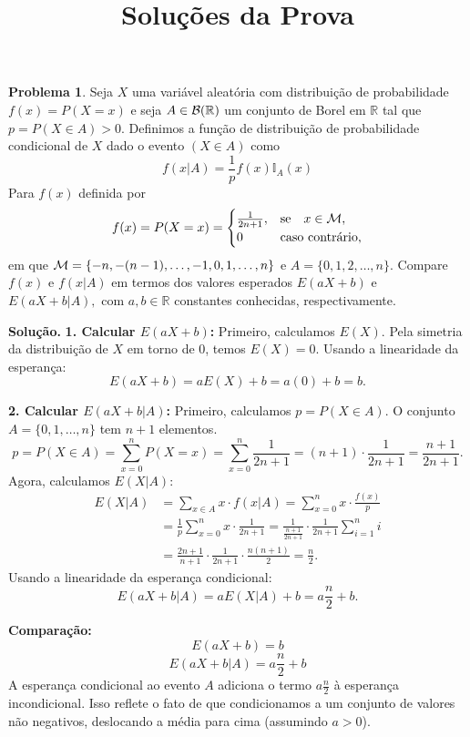 \documentclass{article}
\title{Soluções da Prova}
\author{}
\date{}
\theoremstyle{definition}
\newtheorem{problema}{Problema}
\newenvironment{solucao}{\par\noindent\textbf{Solução.}}{\par}
\begin{document}
	
	\maketitle
	
	\begin{problema}{}
		Seja $X$ uma variável aleatória com distribuição de probabilidade $f(x)=P(X=x)$ e seja $A\in {\cal B}(\mathbb{R})$ um conjunto de Borel em $\mathbb{R}$ tal que $p=P(X\in A)>0.$ Definimos a função de distribuição de probabilidade condicional de $X$ dado o evento $(X\in A)$ como
		$$
		f(x|A) = \frac{1}{p}f(x)\mathbb{I}_A(x)
		$$
		Para $f(x)$  definida por
		$$
		f(x)=P(X=x) = \begin{cases}
			\frac{1}{2n+1}, & \text{se} \quad x \in {\cal M}, \\
			0 & \text{caso contrário},
		\end{cases}
		$$ em que ${\cal M}=\{-n,-(n-1), \ldots, -1, 0, 1, \ldots, n \} $ e $A=\{0,1,2, \ldots, n\}.$ 
		Compare $f(x)$ e $f(x|A)$ em termos dos valores esperados $E(aX+b)$ e $E(aX+b|A),$ com $a,b \in \mathbb{R}$ constantes conhecidas, respectivamente. 
	\end{problema}
	
	\begin{solucao}
		\textbf{1. Calcular $E(aX+b)$:}
		Primeiro, calculamos $E(X)$. Pela simetria da distribuição de $X$ em torno de 0, temos $E(X)=0$.
		Usando a linearidade da esperança:
		\[ E(aX+b) = aE(X) + b = a(0) + b = b. \]
		
		\textbf{2. Calcular $E(aX+b|A)$:}
		Primeiro, calculamos $p = P(X \in A)$. O conjunto $A=\{0, 1, \ldots, n\}$ tem $n+1$ elementos.
		\[ p = P(X \in A) = \sum_{x=0}^{n} P(X=x) = \sum_{x=0}^{n} \frac{1}{2n+1} = (n+1) \cdot \frac{1}{2n+1} = \frac{n+1}{2n+1}. \]
		Agora, calculamos $E(X|A)$:
		\begin{align*}
			E(X|A) &= \sum_{x \in A} x \cdot f(x|A) = \sum_{x=0}^{n} x \cdot \frac{f(x)}{p} \\
			&= \frac{1}{p} \sum_{x=0}^{n} x \cdot \frac{1}{2n+1} = \frac{1}{\frac{n+1}{2n+1}} \cdot \frac{1}{2n+1} \sum_{i=1}^{n} i \\
			&= \frac{2n+1}{n+1} \cdot \frac{1}{2n+1} \cdot \frac{n(n+1)}{2} = \frac{n}{2}.
		\end{align*}
		Usando a linearidade da esperança condicional:
		\[ E(aX+b|A) = aE(X|A) + b = a\frac{n}{2} + b. \]
		
		\textbf{Comparação:}
		\[ E(aX+b) = b \]
		\[ E(aX+b|A) = a\frac{n}{2} + b \]
		A esperança condicional ao evento $A$ adiciona o termo $a \frac{n}{2}$ à esperança incondicional. Isso reflete o fato de que condicionamos a um conjunto de valores não negativos, deslocando a média para cima (assumindo $a>0$).
	\end{solucao}
	
\end{document}
